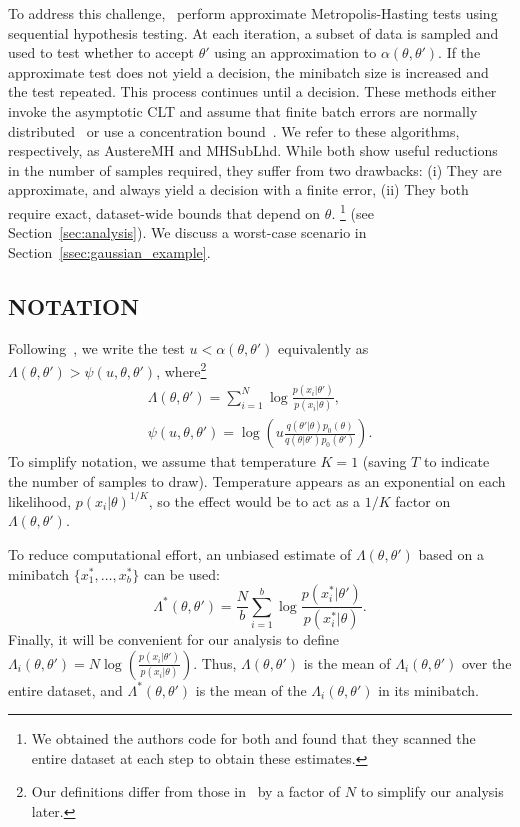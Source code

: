 \documentclass[letterpaper]{article}
\begin{document}
To address this
challenge,~\citep{cutting_mh_2014,icml2014c1_bardenet14} perform
approximate Metropolis-Hasting tests using sequential hypothesis
testing. At each iteration, a subset of data is sampled and used to
test whether to accept $\theta'$ using an approximation to
$\alpha(\theta,\theta')$. If the approximate test does not yield a
decision, the minibatch size is increased and the test repeated. This
process continues until a decision. These methods either invoke the
asymptotic CLT and assume that finite  batch errors are normally
distributed~\citep{cutting_mh_2014} or use a concentration
bound~\citep{icml2014c1_bardenet14}. We refer to these algorithms,
respectively, as {\sc AustereMH} and {\sc MHSubLhd}. While both show
useful reductions in the number of samples required, they suffer from
two drawbacks: (i) They are approximate, and always yield a decision
with a finite error, (ii) They both require exact, dataset-wide bounds
that depend on $\theta$.
\footnote{We obtained the authors code for both and found that they scanned the entire
dataset at each step to obtain these estimates.} (see
Section~\ref{sec:analysis}). We discuss a
worst-case scenario in Section~\ref{ssec:gaussian_example}.


\subsection{NOTATION}\label{ssec:notation}

Following~\citep{icml2014c1_bardenet14}, we write the test
$u<\alpha(\theta,\theta')$ equivalently as $\Lambda(\theta,\theta') >
\psi(u,\theta,\theta')$, where\footnote{Our definitions differ from those
in~\citep{icml2014c1_bardenet14} by a factor of $N$ to simplify our analysis
later.}
\begin{equation}\label{eq:lambda}
\begin{split}
\Lambda(\theta,\theta') = \sum_{i=1}^N \log\frac{p(x_i|\theta')}{p(x_i|\theta)}, \\
\psi(u,\theta,\theta') = \log\left(u\frac{q(\theta'|\theta)p_0(\theta)}{q(\theta|\theta')p_0(\theta')}\right).
\end{split}
\end{equation}
To simplify notation, we assume that temperature $K=1$ (saving $T$ to indicate
the number of samples to draw). Temperature appears as an exponential on each
likelihood, $p(x_i|\theta)^{1/K}$, so the effect would be to act as a $1/K$
factor on $\Lambda(\theta,\theta')$.

To reduce computational effort, an unbiased estimate of $\Lambda(\theta,\theta')$
based on a minibatch $\{x_1^*,\ldots,x_b^*\}$ can be used:
\begin{equation}
\Lambda^*(\theta,\theta') = \frac{N}{b}\sum_{i=1}^b 
\log \frac{p(x_i^*|\theta')}{p(x_i^*|\theta)}.
\end{equation}
Finally, it will be convenient for our analysis to define
$\Lambda_i(\theta,\theta') = N\log(\frac{p(x_i|\theta')}{p(x_i|\theta)})$.
Thus, $\Lambda(\theta,\theta')$ is the mean of $\Lambda_i(\theta,\theta')$ over
the entire dataset, and $\Lambda^*(\theta,\theta')$ is the mean of
the $\Lambda_i(\theta,\theta')$ in its minibatch. 
\end{document}
